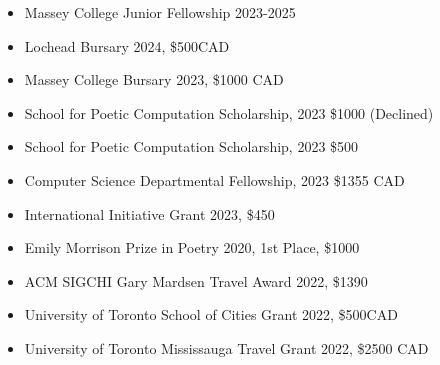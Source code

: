 \begin{itemize}

\item Massey College Junior Fellowship 2023-2025

\item Lochead Bursary 2024, \$500CAD 

\item Massey College Bursary 2023, \$1000 CAD
 
\item  School for Poetic Computation Scholarship, 2023 \$1000 (Declined) 
 
\item School for Poetic Computation Scholarship, 2023 \$500  
 
\item Computer Science Departmental Fellowship, 2023 \$1355 CAD 

\item International Initiative Grant 2023, \$450  

\item Emily Morrison Prize in Poetry 2020, 1st Place,  \$1000  

\item  ACM SIGCHI Gary Mardsen Travel Award 2022, \$1390  
% 
\item University of Toronto School of Cities Grant 2022, \$500CAD 

\item University of Toronto Mississauga Travel Grant 2022, \$2500 CAD 


\end{itemize}
